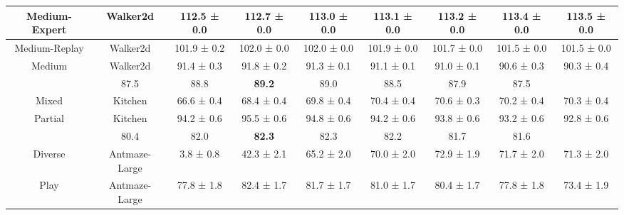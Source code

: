 \begin{table}[t]
{\begin{tabular}{cc|ccccccc}
    \cellcolor[HTML]{FFFFFF}Medium-Expert & \cellcolor[HTML]{FFFFFF}Walker2d       & \cellcolor[HTML]{FFFFFF}112.5 ± 0.0 & 112.7 ± 0.0    & \cellcolor[HTML]{FFFFFF}113.0 ± 0.0 & 113.1 ± 0.0 & 113.2 ± 0.0 & 113.4 ± 0.0 & 113.5 ± 0.0 \\ \midrule
    \cellcolor[HTML]{FFFFFF}Medium-Replay & \cellcolor[HTML]{FFFFFF}Walker2d       & \cellcolor[HTML]{FFFFFF}101.9 ± 0.2 & 102.0 ± 0.0    & \cellcolor[HTML]{FFFFFF}102.0 ± 0.0 & 101.9 ± 0.0 & 101.7 ± 0.0 & 101.5 ± 0.0 & 101.5 ± 0.0 \\ \midrule
    \cellcolor[HTML]{FFFFFF}Medium        & \cellcolor[HTML]{FFFFFF}Walker2d       & \cellcolor[HTML]{FFFFFF}91.4 ± 0.3  & 91.8 ± 0.2     & \cellcolor[HTML]{FFFFFF}91.3 ± 0.1  & 91.1 ± 0.1  & 91.0 ± 0.1  & 90.6 ± 0.3  & 90.3 ± 0.4  \\ \midrule
    \rowcolor[HTML]{E7E6E6} 
    \multicolumn{2}{c}{\cellcolor[HTML]{E7E6E6}\textbf{Performance}}              & 87.5                                & 88.8           & \textbf{89.2}                       & 89.0        & 88.5        & 87.9        & 87.5        \\ \midrule
    \cellcolor[HTML]{FFFFFF}Mixed         & \cellcolor[HTML]{FFFFFF}Kitchen        & \cellcolor[HTML]{FFFFFF}66.6 ± 0.4  & 68.4 ± 0.4     & 69.8 ± 0.4                          & 70.4 ± 0.4  & 70.6 ± 0.3  & 70.2 ± 0.4  & 70.3 ± 0.4  \\ \midrule
    \cellcolor[HTML]{FFFFFF}Partial       & \cellcolor[HTML]{FFFFFF}Kitchen        & \cellcolor[HTML]{FFFFFF}94.2 ± 0.6  & 95.5 ± 0.6     & 94.8 ± 0.6                          & 94.2 ± 0.6  & 93.8 ± 0.6  & 93.2 ± 0.6  & 92.8 ± 0.6  \\ \midrule
    \rowcolor[HTML]{E7E6E6} 
    \multicolumn{2}{c}{\cellcolor[HTML]{E7E6E6}\textbf{Performance}}              & 80.4                                & 82.0           & \textbf{82.3}                       & 82.3        & 82.2        & 81.7        & 81.6        \\ \midrule
    \cellcolor[HTML]{FFFFFF}Diverse       & \cellcolor[HTML]{FFFFFF}Antmaze-Large  & \cellcolor[HTML]{FFFFFF}3.8 ± 0.8   & 42.3 ± 2.1     & 65.2 ± 2.0                          & 70.0 ± 2.0  & 72.9 ± 1.9  & 71.7 ± 2.0  & 71.3 ± 2.0  \\ \midrule
    \cellcolor[HTML]{FFFFFF}Play          & \cellcolor[HTML]{FFFFFF}Antmaze-Large  & \cellcolor[HTML]{FFFFFF}77.8 ± 1.8  & 82.4 ± 1.7     & 81.7 ± 1.7                          & 81.0 ± 1.7  & 80.4 ± 1.7  & 77.8 ± 1.8  & 73.4 ± 1.9  \\ \midrule

\end{tabular}}
\end{table}
